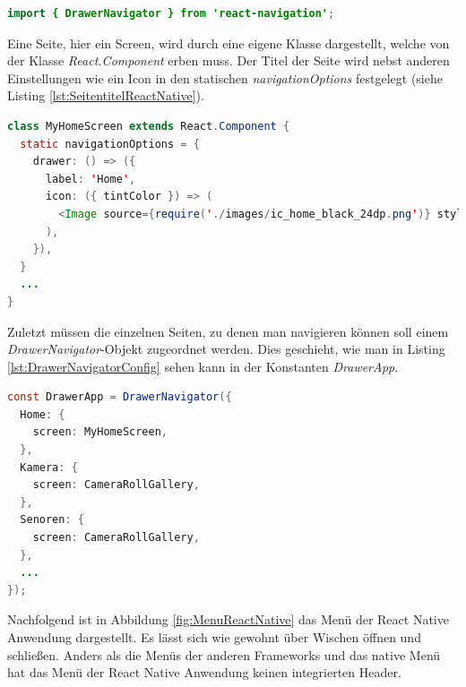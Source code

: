 \begin{lstlisting}[caption=Import der Klasse \textit{DrawerNavigator} für das Menü in React Native, label=lst:ImportDrawerNavigator, language=Java]
import { DrawerNavigator } from 'react-navigation';
\end{lstlisting}

Eine Seite, hier ein Screen, wird durch eine eigene Klasse dargestellt, welche von der Klasse \textit{React.Component} erben muss. Der Titel der Seite wird nebst anderen Einstellungen wie ein Icon in den statischen \textit{navigationOptions} festgelegt (siehe Listing \ref{lst:SeitentitelReactNative}).

\begin{lstlisting}[caption=Festlegen des Seitentitels, label=lst:SeitentitelReactNative, language=Java]
class MyHomeScreen extends React.Component {
  static navigationOptions = {
    drawer: () => ({
      label: 'Home',
      icon: ({ tintColor }) => (
        <Image source={require('./images/ic_home_black_24dp.png')} style={[styles.icon, {tintColor: tintColor}]}/>
      ),
    }),
  }
  ...
}
\end{lstlisting}

Zuletzt müssen die einzelnen Seiten, zu denen man navigieren können soll einem \textit{DrawerNavigator}-Objekt zugeordnet werden. Dies geschieht, wie man in Listing \ref{lst:DrawerNavigatorConfig} sehen kann in der Konstanten \textit{DrawerApp}. 
\clearpage

\begin{lstlisting}[caption=Konfiguration des \textit{DrawerNavigators}, label=lst:DrawerNavigatorConfig, language=Java]
const DrawerApp = DrawerNavigator({
  Home: {
    screen: MyHomeScreen,
  },
  Kamera: {
    screen: CameraRollGallery,
  },
  Senoren: {
    screen: CameraRollGallery,
  },
  ...
});
\end{lstlisting}

Nachfolgend ist in Abbildung \ref{fig:MenuReactNative} das Menü der React Native Anwendung dargestellt. Es lässt sich wie gewohnt über Wischen öffnen und schließen. Anders als die Menüs der anderen Frameworks und das native Menü hat das Menü der React Native Anwendung keinen integrierten Header.

